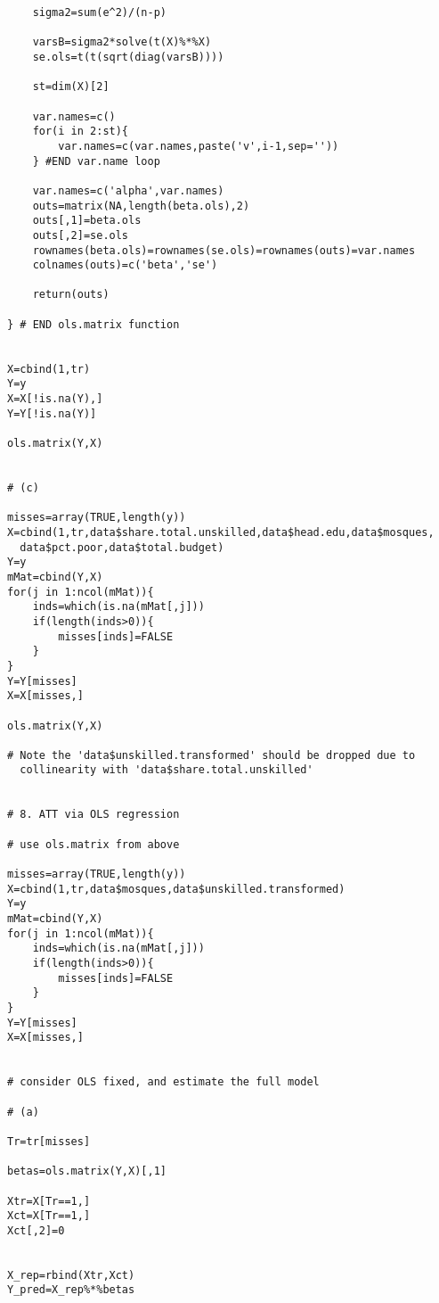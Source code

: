 \documentclass{article}
\begin{document}
\begin{verbatim}
	sigma2=sum(e^2)/(n-p)

	varsB=sigma2*solve(t(X)%*%X)
	se.ols=t(t(sqrt(diag(varsB))))
	                    
	st=dim(X)[2]
	    
	var.names=c()       
	for(i in 2:st){
		var.names=c(var.names,paste('v',i-1,sep=''))
	} #END var.name loop     
	            
	var.names=c('alpha',var.names)   
	outs=matrix(NA,length(beta.ols),2)        
	outs[,1]=beta.ols            
	outs[,2]=se.ols
	rownames(beta.ols)=rownames(se.ols)=rownames(outs)=var.names
	colnames(outs)=c('beta','se')
	  
	return(outs)       	  
	
} # END ols.matrix function
                           

X=cbind(1,tr)
Y=y
X=X[!is.na(Y),]
Y=Y[!is.na(Y)]   

ols.matrix(Y,X)

 
# (c)
                                                                                                             
misses=array(TRUE,length(y))
X=cbind(1,tr,data$share.total.unskilled,data$head.edu,data$mosques,
  data$pct.poor,data$total.budget)          
Y=y          
mMat=cbind(Y,X)
for(j in 1:ncol(mMat)){
	inds=which(is.na(mMat[,j])) 
	if(length(inds>0)){
		misses[inds]=FALSE 
	}	
}
Y=Y[misses]
X=X[misses,]

ols.matrix(Y,X)   

# Note the 'data$unskilled.transformed' should be dropped due to 
  collinearity with 'data$share.total.unskilled'


# 8. ATT via OLS regression        

# use ols.matrix from above 
      
misses=array(TRUE,length(y))
X=cbind(1,tr,data$mosques,data$unskilled.transformed)          
Y=y          
mMat=cbind(Y,X)
for(j in 1:ncol(mMat)){
	inds=which(is.na(mMat[,j])) 
	if(length(inds>0)){
		misses[inds]=FALSE 
	}	
}
Y=Y[misses]
X=X[misses,]
      

# consider OLS fixed, and estimate the full model 

# (a)        

Tr=tr[misses]    
   
betas=ols.matrix(Y,X)[,1]     

Xtr=X[Tr==1,]
Xct=X[Tr==1,]   
Xct[,2]=0
            

X_rep=rbind(Xtr,Xct)
Y_pred=X_rep%*%betas
           

\end{verbatim}
\end{document}
